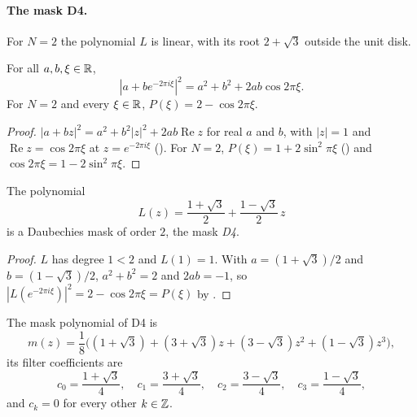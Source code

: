 \paragraph{The mask D4.}
For $N = 2$ the polynomial $L$ is linear, with its root $2 + \sqrt 3$ outside the unit disk.

\begin{lemma}
\label{lem:daub-linear-circle}
\leanok
{}
For all $a, b, \xi \in \mathbb{R}$,
\[
  |a + b e^{-2\pi i \xi}|^2 = a^2 + b^2 + 2ab \cos 2\pi\xi .
\]
For $N = 2$ and every $\xi \in \mathbb{R}$, $P(\xi) = 2 - \cos 2\pi\xi$.
\end{lemma}

\begin{proof}
\leanok
{}
$|a + bz|^2 = a^2 + b^2 |z|^2 + 2ab \operatorname{Re} z$ for real $a$ and $b$, with $|z| = 1$ and
$\operatorname{Re} z = \cos 2\pi\xi$ at $z = e^{-2\pi i \xi}$ (). For $N = 2$,
$P(\xi) = 1 + 2 \sin^2 \pi\xi$ () and $\cos 2\pi\xi = 1 - 2 \sin^2 \pi\xi$.
\end{proof}

\begin{proposition}
\label{prop:daub-d4}
\leanok
{}
The polynomial
\[
  L(z) = \frac{1 + \sqrt 3}{2} + \frac{1 - \sqrt 3}{2} \, z
\]
is a Daubechies mask of order $2$, the mask \emph{D4}.
\end{proposition}

\begin{proof}
\leanok
{}
$L$ has degree $1 < 2$ and $L(1) = 1$. With $a = (1 + \sqrt 3)/2$ and $b = (1 - \sqrt 3)/2$,
$a^2 + b^2 = 2$ and $2ab = -1$, so $|L(e^{-2\pi i \xi})|^2 = 2 - \cos 2\pi\xi = P(\xi)$ by
.
\end{proof}

\begin{proposition}
\label{prop:daub-d4-coeff}
\leanok
{}
The mask polynomial of D4 is
\[
  m(z) = \frac18 \bigl((1 + \sqrt 3) + (3 + \sqrt 3) z + (3 - \sqrt 3) z^2
    + (1 - \sqrt 3) z^3\bigr) ,
\]
its filter coefficients are
\[
  c_0 = \frac{1 + \sqrt 3}{4} , \quad c_1 = \frac{3 + \sqrt 3}{4} , \quad
  c_2 = \frac{3 - \sqrt 3}{4} , \quad c_3 = \frac{1 - \sqrt 3}{4} ,
\]
and $c_k = 0$ for every other $k \in \mathbb{Z}$.
\end{proposition}

